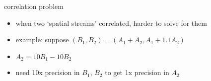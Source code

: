 \begin{frame}{correlation problem}
    \begin{itemize}
    \item when two `spatial streams' correlated, harder to solve for them
    \item example: suppose $(B_1,B_2)=(A_1+A_2,A_1+1.1A_2)$
    \vspace{.5cm}
    \item $A_2=10B_1-10B_2$
    \item need 10x precision in $B_1$, $B_2$ to get 1x precision in $A_2$
    \end{itemize}
\end{frame}
